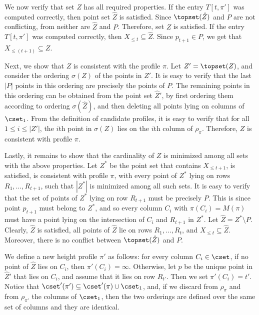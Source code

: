 \documentclass{toc}
\begin{document}
We now verify that set $Z$ has all required properties. If the entry $T[t,\pi']$ was computed correctly, then point set $\hat Z$ is satisfied. Since $\topset(\hat Z)$ and $P$ are not conflicting, from  neither are $\hat Z$ and $P$. Therefore, set $Z$ is satisfied. 
If the entry $T[t,\pi']$ was computed correctly, then $X_{\leq t}\subseteq \hat Z$. Since $p_{t+1}\in P$, we get that $X_{\leq (t+1)}\subseteq Z$. 

Next, we show that $Z$ is consistent with the profile $\pi$. Let $Z'=\topset(Z)$, and consider the ordering $\sigma(Z)$ of the points in $Z'$. It is easy to verify that the last $|P|$ points in this ordering are precisely the points of $P$. The remaining points in this ordering can be obtained from the point set $\hat Z'$, by first ordering them according to ordering $\sigma(\hat Z)$, and then deleting all points lying on columns of $\cset_1$. From the definition of candidate profiles, it is easy to verify that for all $1\leq i\leq |Z'|$, the $i$th point in $\sigma(Z)$ lies on the $i$th column of $\rho_{\pi}$. Therefore, $Z$ is consistent with profile $\pi$.


Lastly, it remains to show that the cardinality of $Z$ is minimized among all sets with the above properties. Let $Z^*$ be the point set that contains $X_{\leq t+1}$, is satisfied, is consistent with profile $\pi$, with every point of $Z^*$ lying on rows $R_1,\ldots,R_{t+1}$,  such that $|Z^*|$ is minimized among all such sets. It is easy to verify that the set of points of $Z^*$ lying on row $R_{t+1}$ must be precisely $P$. This is since point $p_{t+1}$ must belong to $Z^*$, and so every column $C_i$ with $\pi(C_i)=M(\pi)$ must have a point lying on the intersection of $C_i$ and $R_{t+1}$ in $Z^*$. Let $\hat Z=Z^*\setminus P$.
Clearly, $\hat Z$ is satisfied, all points of $\hat Z$ lie on rows $R_1,\ldots,R_t$, and $X_{\leq t}\subseteq \hat Z$. Moreover, there is no conflict between $\topset(\hat Z)$ and $P$.

We define a new height profile $\pi'$ as follows: for every column $C_i\in \cset$, if no point of $\hat Z$ lies on $C_i$, then $\pi'(C_i)=\infty$. Otherwise, let $p$ be the unique point in $\hat Z'$ that lies on $C_i$, and assume that it lies on row $R_{t'}$. Then we set $\pi'(C_i)=t'$. Notice that $\cset'(\pi')\subseteq \cset'(\pi)\cup \cset_1$, and, if we discard from $\rho_{\pi}$ and from $\rho_{\pi'}$ the columns of $\cset_1$, then the two orderings are defined over the same set of columns and they are identical.
\end{document}
